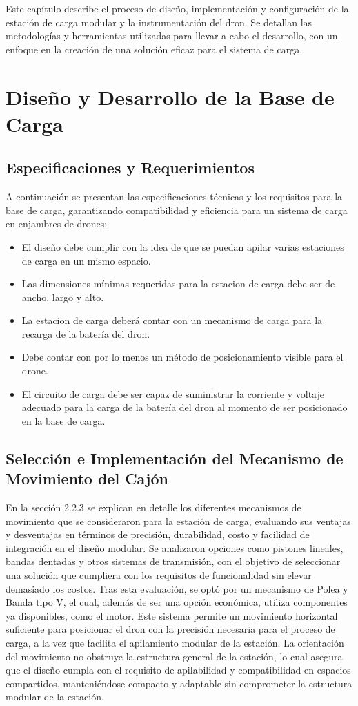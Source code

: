 Este capítulo describe el proceso de diseño, implementación y configuración de la estación de carga modular y la instrumentación del dron. Se detallan las metodologías y herramientas utilizadas para llevar a cabo el desarrollo, con un enfoque en la creación de una solución eficaz para el sistema de carga.

\section{Diseño y Desarrollo de la Base de Carga}
\subsection{Especificaciones y Requerimientos}
A continuación se presentan las especificaciones técnicas y los requisitos para la base de carga, garantizando compatibilidad y eficiencia para un sistema de carga en enjambres de drones:
    \begin{itemize}
        \item El diseño debe cumplir con la idea de que se puedan apilar varias estaciones de carga en un mismo espacio.
        \item Las dimensiones mínimas requeridas para la estacion de carga debe ser de ancho, largo y alto.
        \item La estacion de carga deberá contar con un mecanismo de carga para la recarga de la batería del dron.
        \item Debe contar con por lo menos un método de posicionamiento visible para el drone.
        \item El circuito de carga debe ser capaz de suministrar la corriente y voltaje adecuado para la carga de la batería del dron al momento de ser posicionado en la base de carga.
    \end{itemize}

\subsection{Selección e Implementación del Mecanismo de Movimiento del Cajón}

En la sección 2.2.3 se explican en detalle los diferentes mecanismos de movimiento que se consideraron para la estación de carga, evaluando sus ventajas y desventajas en términos de precisión, durabilidad, costo y facilidad de integración en el diseño modular. Se analizaron opciones como pistones lineales, bandas dentadas y otros sistemas de transmisión, con el objetivo de seleccionar una solución que cumpliera con los requisitos de funcionalidad sin elevar demasiado los costos. 
Tras esta evaluación, se optó por un mecanismo de Polea y Banda tipo V, el cual, además de ser una opción económica, utiliza componentes ya disponibles, como el motor. Este sistema permite un movimiento horizontal suficiente para posicionar el dron con la precisión necesaria para el proceso de carga, a la vez que facilita el apilamiento modular de la estación. La orientación del movimiento no obstruye la estructura general de la estación, lo cual asegura que el diseño cumpla con el requisito de apilabilidad y compatibilidad en espacios compartidos, manteniéndose compacto y adaptable sin comprometer la estructura modular de la estación.

